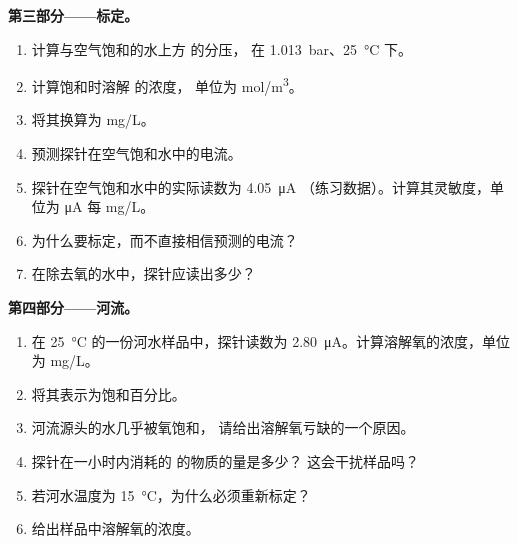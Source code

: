 \begin{problem}
\medskip
\noindent\textbf{第三部分——标定。}
\begin{enumerate}[resume]
  \item 计算与空气饱和的水上方  的分压，
        在 \qty{1.013}{bar}、\qty{25}{\degreeCelsius} 下。
  \item 计算饱和时溶解  的浓度，
        单位为 \unit{mol/m^3}。
  \item 将其换算为 \unit{mg/L}。
  \item 预测探针在空气饱和水中的电流。
  \item 探针在空气饱和水中的实际读数为 \qty{4.05}{\micro A}
        （练习数据）。计算其灵敏度，单位为 \unit{\micro A} 每
        \unit{mg/L}。
  \item 为什么要标定，而不直接相信预测的电流？
  \item 在除去氧的水中，探针应读出多少？
\end{enumerate}

\medskip
\noindent\textbf{第四部分——河流。}
\begin{enumerate}[resume]
  \item 在 \qty{25}{\degreeCelsius} 的一份河水样品中，探针读数为
        \qty{2.80}{\micro A}。计算溶解氧的浓度，单位为 \unit{mg/L}。
  \item 将其表示为饱和百分比。
  \item 河流源头的水几乎被氧饱和，
        请给出溶解氧亏缺的一个原因。
  \item 探针在一小时内消耗的  的物质的量是多少？
        这会干扰样品吗？
  \item 若河水温度为
        \qty{15}{\degreeCelsius}，为什么必须重新标定？
  \item 给出样品中溶解氧的浓度。
\end{enumerate}
\end{problem}
